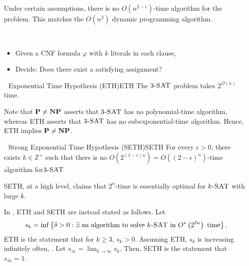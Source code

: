         \begin{example}
            Under certain assumptions, there is no \(O(n^{2-\epsilon})\)-time algorithm for the  problem. This matches the \(O(n^2)\) dynamic programming algorithm.
        \end{example}
        \pagebreak
        \begin{compprob} \label{prob:ksat}
            \vphantom
            \\
            \begin{itemize}
                \item Given a CNF formula \(\varphi\) with \(k\) literals in each clause,
                \item Decide: Does there exist a satisfying assignment?
            \end{itemize}
        \end{compprob}
        \begin{hypothesis}{\Stop\,\,\cite{impagliazzo2001ksatcomplexity} Exponential Time Hypothesis (ETH)}{ETH}
            The \(3\textsc{-SAT}\) problem takes \(2^{\Omega(n)}\) time.
        \end{hypothesis}
        \begin{remark*}
            Note that \(\mathbf{P}\neq\mathbf{NP}\) asserts that \(3\textsc{-SAT}\) has no polynomial-time algorithm, whereas ETH asserts that \(3\textsc{-SAT}\) has no subexponential-time algorithm. Hence, ETH implies \(\mathbf{P}\neq\mathbf{NP}\).
        \end{remark*}
        \begin{hypothesis}{\Stop\,\,\cite{impagliazzo2001ksatcomplexity,impagliazzo2001stronglyexp} Strong Exponential Time Hypothesis (SETH)}{SETH}
            For every \(\epsilon>0\), there exists \(k\in\mathbb{Z}^+\) such that there is no \(O\left(2^{(1-\epsilon)n}\right)=O((2-\epsilon)^n)\)-time algorithm for\(3\textsc{-SAT}\)
        \end{hypothesis}
        \begin{remark*}
            SETH, at a high level, claims that \(2^n\)-time is essentially optimal for \(k\textsc{-SAT}\) with large \(k\).
        \end{remark*}
        \begin{remark*}
            In \cite{impagliazzo2001ksatcomplexity,impagliazzo2001stronglyexp}, ETH and SETH are instead stated as follows. Let
            \begin{equation*}
            s_k=\inf\left\{\delta>0: \exists \text{ an algorithm to solve }k\textsc{-SAT}\text{ in }O^*\left(2^{\delta n}\right)\text{ time}\right\}.
            \end{equation*}
            ETH is the statement that for \(k\geq3\), \(s_k>0\). Assuming ETH, \(s_k\) is increasing infinitely often, \cite{impagliazzo2001stronglyexp}. Let \(s_\infty=\lim_{k\to\infty} s_k\). Then, SETH is the statement that \(s_\infty=1\).
        \end{remark*}
